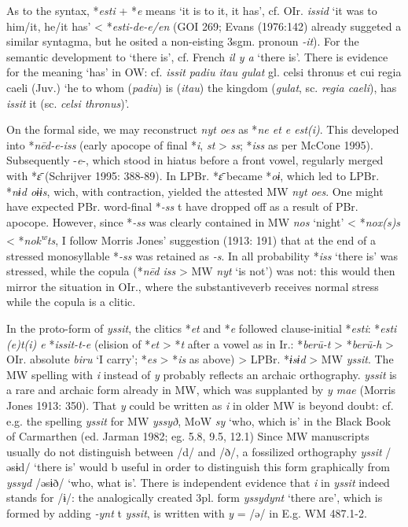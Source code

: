 {As to the syntax, *\textit{esti} + *\textit{e} means `it is to it, it has', cf. OIr. \textit{issid} `it was to him/it, he/it has' < *\textit{esti-de-e/en} (GOI 269; Evans (1976:142) already suggeted a similar syntagma, but he osited a non-eisting 3sgm. pronoun \textit{-it}). For the semantic development to `there is', cf. French \textit{il y a} `there is'. There is evidence for the meaning `has' in OW: cf. \textit{issit padiu itau gulat} gl. celsi thronus et cui regia caeli (Juv.) `he to whom (\textit{padiu}) is (\textit{itau}) the kingdom (\textit{gulat}, sc. \textit{regia caeli}), has \textit{issit} it (sc. \textit{celsi thronus})'.

On the formal side, we may reconstruct \textit{nyt oes} as *\textit{ne et e est(i)}. This developed into *\textit{n\=ed-e-iss} (early apocope of final *\textit{i}, \textit{st} > \textit{ss}; *\textit{iss} as per McCone 1995). Subsequently -\textit{e}-, which stood in hiatus before a front vowel, regularly merged with *\textit{\=ɛ} (Schrijver 1995: 388-89). In LPBr. *\textit{\=ɛ} became *\textit{oɨ}, which led to LPBr. *\textit{nɨd oɨɨs}, wich, with contraction, yielded the attested MW \textit{nyt oes}. One might have expected PBr. word-final *\textit{-ss} t have dropped off as a result of PBr. apocope. However, since *\textit{-ss} was 
clearly contained in MW \textit{nos} `night' < *\textit{nox(s)s} < *\textit{nok\textsuperscript{w}ts}, I follow Morris Jones' suggestion (1913: 191) that at the end of a stressed monosyllable *\textit{-ss} was retained as \textit{-s}. In all probability *\textit{iss} `there is' was stressed, while the copula (*\textit{n\=ed iss} > MW \textit{nyt} `is not') was not: this would then mirror the situation in OIr., where the substantiveverb receives normal stress while the copula is a clitic.

In the proto-form of \textit{yssit}, the clitics *\textit{et} and *\textit{e} followed clause-initial *\textit{esti}: *\textit{esti (e)t(i) e} *\textit{issit-t-e} (elision of *\textit{et} > *\textit{t} after a vowel as in Ir.: *\textit{ber\=u-t} > *\textit{ber\=u-h} > OIr. absolute \textit{biru} `I carry'; *\textit{es} > *\textit{is} as above) > LPBr. *\textit{ɨsɨd} > MW \textit{yssit}. The MW spelling with \textit{i} instead of \textit{y} probably reflects an archaic orthography. \textit{yssit} is a rare and archaic form already in MW, which was supplanted by \textit{y mae} (Morris Jones 1913: 350). That \textit{y} could be written as \textit{i} in older MW is beyond doubt: cf. e.g. the spelling \textit{yssit} for MW \textit{yssyð}, MoW \textit{sy} `who, which is' in the Black Book of Carmarthen (ed. Jarman 1982; eg. 5.8, 9.5, 12.1) Since MW manuscripts usually do not distinguish between /d/ and /ð/, a fossilized orthography \textit{yssit} /əsɨd/ `there is' would b useful in order to distinguish this form graphically from \textit{yssyd} /əsɨð/ `who, what is'. There is independent evidence that \textit{i} in \textit{yssit} indeed stands for /ɨ/: the analogically created 3pl. form \textit{yssydynt} `there are', which is formed by adding \textit{-ynt} t \textit{yssit}, is written with \textit{y} = /ə/ in E.g. WM 487.1-2.

}
